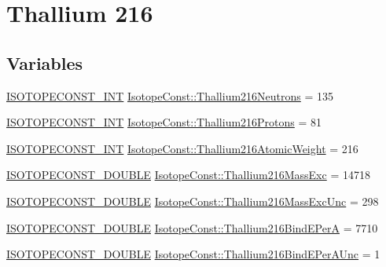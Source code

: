 \hypertarget{group___isotope_const-_thallium-_tl216}{}\section{Thallium 216}
\label{group___isotope_const-_thallium-_tl216}
\subsection*{Variables}
\begin{DoxyCompactItemize}
\item 
\mbox{\hyperlink{group___isotope_const-_macros_ga5f18360b3e99483a35c32d789e62621c}{I\+S\+O\+T\+O\+P\+E\+C\+O\+N\+S\+T\+\_\+\+I\+NT}} \mbox{\hyperlink{group___isotope_const-_thallium-_tl216_ga6ce7ed1a7c0faf3c8599b43078299d9f}{Isotope\+Const\+::\+Thallium216\+Neutrons}} = 135
\item 
\mbox{\hyperlink{group___isotope_const-_macros_ga5f18360b3e99483a35c32d789e62621c}{I\+S\+O\+T\+O\+P\+E\+C\+O\+N\+S\+T\+\_\+\+I\+NT}} \mbox{\hyperlink{group___isotope_const-_thallium-_tl216_gaacb0c62847482e32fbd44eadbe0bbf44}{Isotope\+Const\+::\+Thallium216\+Protons}} = 81
\item 
\mbox{\hyperlink{group___isotope_const-_macros_ga5f18360b3e99483a35c32d789e62621c}{I\+S\+O\+T\+O\+P\+E\+C\+O\+N\+S\+T\+\_\+\+I\+NT}} \mbox{\hyperlink{group___isotope_const-_thallium-_tl216_gaf72a1752d6f1697c224fa84208f61983}{Isotope\+Const\+::\+Thallium216\+Atomic\+Weight}} = 216
\item 
\mbox{\hyperlink{group___isotope_const-_macros_ga8f45a7272ce02c0b4c65c44636ed719a}{I\+S\+O\+T\+O\+P\+E\+C\+O\+N\+S\+T\+\_\+\+D\+O\+U\+B\+LE}} \mbox{\hyperlink{group___isotope_const-_thallium-_tl216_gace275025c8c7ffa7df6628a325dd89be}{Isotope\+Const\+::\+Thallium216\+Mass\+Exc}} = 14718
\item 
\mbox{\hyperlink{group___isotope_const-_macros_ga8f45a7272ce02c0b4c65c44636ed719a}{I\+S\+O\+T\+O\+P\+E\+C\+O\+N\+S\+T\+\_\+\+D\+O\+U\+B\+LE}} \mbox{\hyperlink{group___isotope_const-_thallium-_tl216_ga1676ccf02736b2845cc7c14f356f945f}{Isotope\+Const\+::\+Thallium216\+Mass\+Exc\+Unc}} = 298
\item 
\mbox{\hyperlink{group___isotope_const-_macros_ga8f45a7272ce02c0b4c65c44636ed719a}{I\+S\+O\+T\+O\+P\+E\+C\+O\+N\+S\+T\+\_\+\+D\+O\+U\+B\+LE}} \mbox{\hyperlink{group___isotope_const-_thallium-_tl216_ga4ec81d266cba43fabb965760b986ef52}{Isotope\+Const\+::\+Thallium216\+Bind\+E\+PerA}} = 7710
\item 
\mbox{\hyperlink{group___isotope_const-_macros_ga8f45a7272ce02c0b4c65c44636ed719a}{I\+S\+O\+T\+O\+P\+E\+C\+O\+N\+S\+T\+\_\+\+D\+O\+U\+B\+LE}} \mbox{\hyperlink{group___isotope_const-_thallium-_tl216_ga1c4a390884ec405cb521a7b085ed52ef}{Isotope\+Const\+::\+Thallium216\+Bind\+E\+Per\+A\+Unc}} = 1

\end{DoxyCompactItemize}
